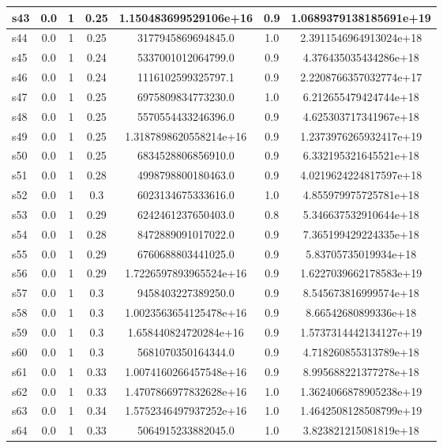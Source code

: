 \documentclass{article}
\begin{document}
\begin{tabular}{|l|c|c|c|c|c|c|}
\hline
s43 &0.0 & 1 & 0.25 & 1.150483699529106e+16 & 0.9 & 1.0689379138185691e+19\\
\hline
s44 &0.0 & 1 & 0.25 & 3177945869694845.0 & 1.0 & 2.3911546964913024e+18\\
\hline
s45 &0.0 & 1 & 0.24 & 5337001012064799.0 & 0.9 & 4.376435035434286e+18\\
\hline
s46 &0.0 & 1 & 0.24 & 1116102599325797.1 & 0.9 & 2.2208766357032774e+17\\
\hline
s47 &0.0 & 1 & 0.25 & 6975809834773230.0 & 1.0 & 6.212655479424744e+18\\
\hline
s48 &0.0 & 1 & 0.25 & 5570554433246396.0 & 0.9 & 4.625303717341967e+18\\
\hline
s49 &0.0 & 1 & 0.25 & 1.3187898620558214e+16 & 0.9 & 1.2373976265932417e+19\\
\hline
s50 &0.0 & 1 & 0.25 & 6834528806856910.0 & 0.9 & 6.332195321645521e+18\\
\hline
s51 &0.0 & 1 & 0.28 & 4998798800180463.0 & 0.9 & 4.0219624224817597e+18\\
\hline
s52 &0.0 & 1 & 0.3 & 6023134675333616.0 & 1.0 & 4.855979975725781e+18\\
\hline
s53 &0.0 & 1 & 0.29 & 6242461237650403.0 & 0.8 & 5.346637532910644e+18\\
\hline
s54 &0.0 & 1 & 0.28 & 8472889091017022.0 & 0.9 & 7.365199429224335e+18\\
\hline
s55 &0.0 & 1 & 0.29 & 6760688803441025.0 & 0.9 & 5.83705735019934e+18\\
\hline
s56 &0.0 & 1 & 0.29 & 1.7226597893965524e+16 & 0.9 & 1.6227039662178583e+19\\
\hline
s57 &0.0 & 1 & 0.3 & 9458403227389250.0 & 0.9 & 8.545673816999574e+18\\
\hline
s58 &0.0 & 1 & 0.3 & 1.0023563654125478e+16 & 0.9 & 8.66542680899336e+18\\
\hline
s59 &0.0 & 1 & 0.3 & 1.658440824720284e+16 & 0.9 & 1.5737314442134127e+19\\
\hline
s60 &0.0 & 1 & 0.3 & 5681070350164344.0 & 0.9 & 4.718260855313789e+18\\
\hline
s61 &0.0 & 1 & 0.33 & 1.0074160266457548e+16 & 0.9 & 8.995688221377278e+18\\
\hline
s62 &0.0 & 1 & 0.33 & 1.4707866977832628e+16 & 1.0 & 1.3624066878905238e+19\\
\hline
s63 &0.0 & 1 & 0.34 & 1.5752346497937252e+16 & 1.0 & 1.4642508128508799e+19\\
\hline
s64 &0.0 & 1 & 0.33 & 5064915233882045.0 & 1.0 & 3.823821215081819e+18\\

\end{tabular}
\end{document}

